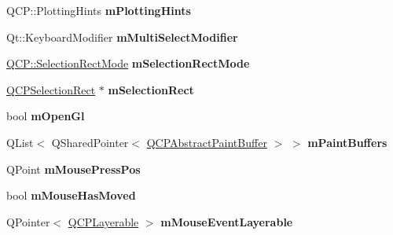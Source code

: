 \begin{DoxyCompactItemize}
\item 
Q\+C\+P\+::\+Plotting\+Hints {\bfseries m\+Plotting\+Hints}\hypertarget{classQCustomPlot_aa184197a6101a9cc5807469e1d006c9e}{}\label{classQCustomPlot_aa184197a6101a9cc5807469e1d006c9e}

\item 
Qt\+::\+Keyboard\+Modifier {\bfseries m\+Multi\+Select\+Modifier}\hypertarget{classQCustomPlot_a0e97e701c5671e7e463d2ce0211d0f8a}{}\label{classQCustomPlot_a0e97e701c5671e7e463d2ce0211d0f8a}

\item 
\hyperlink{namespaceQCP_ac9aa4d6d81ac76b094f9af9ad2d3aacf}{Q\+C\+P\+::\+Selection\+Rect\+Mode} {\bfseries m\+Selection\+Rect\+Mode}\hypertarget{classQCustomPlot_abe04c5def373cc4fede8de20542ca3f2}{}\label{classQCustomPlot_abe04c5def373cc4fede8de20542ca3f2}

\item 
\hyperlink{classQCPSelectionRect}{Q\+C\+P\+Selection\+Rect} $\ast$ {\bfseries m\+Selection\+Rect}\hypertarget{classQCustomPlot_a4827bc84ef5ce52dfbf9ff630ed1b276}{}\label{classQCustomPlot_a4827bc84ef5ce52dfbf9ff630ed1b276}

\item 
bool {\bfseries m\+Open\+Gl}\hypertarget{classQCustomPlot_a0841dbea13bd120d20e3f0cc36767ff9}{}\label{classQCustomPlot_a0841dbea13bd120d20e3f0cc36767ff9}

\item 
Q\+List$<$ Q\+Shared\+Pointer$<$ \hyperlink{classQCPAbstractPaintBuffer}{Q\+C\+P\+Abstract\+Paint\+Buffer} $>$ $>$ {\bfseries m\+Paint\+Buffers}\hypertarget{classQCustomPlot_a57b270b1e3990e0d1b9fb39b137d5a5d}{}\label{classQCustomPlot_a57b270b1e3990e0d1b9fb39b137d5a5d}

\item 
Q\+Point {\bfseries m\+Mouse\+Press\+Pos}\hypertarget{classQCustomPlot_ac57090da95056ae4dd67be67adfa85bd}{}\label{classQCustomPlot_ac57090da95056ae4dd67be67adfa85bd}

\item 
bool {\bfseries m\+Mouse\+Has\+Moved}\hypertarget{classQCustomPlot_ad2108936f001a8be5974b0b6ff13dae3}{}\label{classQCustomPlot_ad2108936f001a8be5974b0b6ff13dae3}

\item 
Q\+Pointer$<$ \hyperlink{classQCPLayerable}{Q\+C\+P\+Layerable} $>$ {\bfseries m\+Mouse\+Event\+Layerable}\hypertarget{classQCustomPlot_a243867f445d2f4e35e00add2f589e1da}{}\label{classQCustomPlot_a243867f445d2f4e35e00add2f589e1da}


\end{DoxyCompactItemize}
